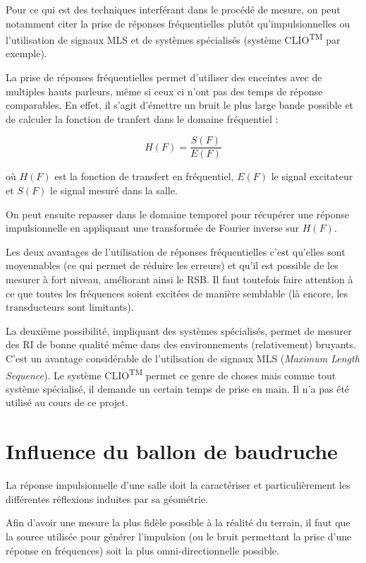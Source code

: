 Pour ce qui est des techniques interférant dans le procédé de mesure, on peut notamment citer la prise de réponses
fréquentielles plutôt qu'impulsionnelles ou l'utilisation de signaux MLS et de systèmes spécialisés (système CLIO\textsuperscript{\textsc{TM}} par
exemple).

\newpage %

La prise de réponses fréquentielles permet d'utiliser des enceintes avec de multiples hauts parleurs, même si ceux ci
n'ont pas des temps de réponse comparables. En effet, il s'agit d'émettre un bruit le plus large bande possible et de
calculer la fonction de tranfert dans le domaine fréquentiel :

$$H(F) = \frac{S(F)}{E(F)}$$

où $H(F)$ est la fonction de transfert en fréquentiel, $E(F)$ le signal excitateur et $S(F)$ le signal mesuré dans la
salle.

On peut ensuite repasser dans le domaine temporel pour récupérer une réponse impulsionnelle en appliquant une transformée
de Fourier inverse sur $H(F)$.

Les deux avantages de l'utilisation de réponses fréquentielles c'est qu'elles sont moyennables (ce qui permet de réduire
les erreurs) et qu'il est possible de les mesurer à fort niveau, améliorant ainsi le RSB. Il faut toutefois faire
attention à ce que toutes les fréquences soient excitées de manière semblable (là encore, les transducteurs sont
limitants).

La deuxième possibilité, impliquant des systèmes spécialisés, permet de mesurer des RI de bonne qualité même dans des
environnements (relativement) bruyants. C'est un avantage considérable de l'utilisation de signaux MLS (\textit{Maximum
Length Sequence}). Le système CLIO\textsuperscript{\textsc{TM}} permet ce genre de choses mais comme tout système
spécialisé, il demande un certain temps de prise en main. Il n'a pas été utilisé au cours de ce projet.

\section{Influence du ballon de baudruche} %

La réponse impulsionnelle d'une salle doit la caractériser et particulièrement les différentes réflexions induites
par sa géométrie.

Afin d'avoir une mesure la plus fidèle possible à la réalité du terrain, il faut que la source utilisée pour générer
l'impulsion (ou le bruit permettant la prise d'une réponse en fréquences) soit la plus omni-directionnelle possible.

